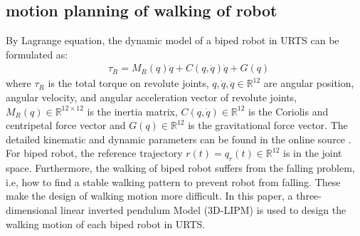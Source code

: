 \documentclass{ieeeaccess}
\begin{document}


\subsection{motion planning of walking of robot}
By Lagrange equation, the dynamic model of a biped robot in URTS can be formulated as:
\begin{equation} \label{eq:robot} 
    \begin{split}
        & \tau_R = M_R(q)\ddot{q} + C(q,\dot{q})\dot{q} + G(q)    
    \end{split}
\end{equation}
where $\tau_R$ is the total torque on revolute joints, $q,\dot{q},\ddot{q}\in\mathbb{R}^{12}$  are angular position, angular velocity, and angular acceleration vector of revolute joints, $M_R(q)\in\mathbb{R}^{12\times 12}$ is the inertia matrix, $C(q,\dot{q})\in\mathbb{R}^{12}$ is the Coriolis and centripetal force vector and $G(q)\in\mathbb{R}^{12}$ is the gravitational force vector. The detailed kinematic and dynamic parameters can be found in the online source \cite{ourrobot}. For biped robot, the reference trajectory $r(t)=q_r(t)\in\mathbb{R}^{12}$ is in the joint space. Furthermore, the walking of biped robot suffers from the falling problem, i.e, how to find a stable walking pattern to prevent robot from falling. These make the design of walking motion more difficult. In this paper, a three-dimensional linear inverted pendulum Model (3D-LIPM) \cite{kajita2001real} is used to design the walking motion of each biped robot in URTS.
\end{document}
